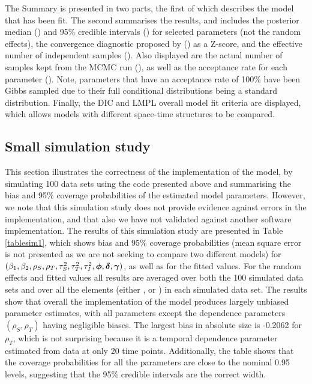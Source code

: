 \documentclass[article, nojss]{jss}
\newcommand{\bd}[1]{\ensuremath{\mbox{\boldmath $#1$}}}
\begin{document}
The Summary is presented in two parts, the first of which describes the model that has been fit. The second summarises the results, and includes the posterior median () and 95\% credible intervals () for selected parameters (not the random effects), the convergence diagnostic proposed by \cite{geweke1992} () as a Z-score, and the effective number of independent samples (). Also displayed are the actual number of samples kept from the MCMC run  (), as well as the acceptance rate for each parameter (). Note, parameters that have an acceptance rate of 100\% have been Gibbs sampled due to their full conditional distributions being a standard distribution. Finally, the DIC and LMPL overall model fit criteria are displayed, which allows models with different space-time structures to be compared. 


\subsection{Small simulation study}
This section illustrates the correctness of the  implementation of the  model, by simulating 100 data sets using the code presented above and summarising the bias and 95\% coverage probabilities of the estimated model parameters. However, we note that this simulation study does not provide evidence against errors in the implementation, and that also we have not validated  against another software implementation. The results of this simulation study are presented in Table \ref{tablesim1}, which shows bias and 95\% coverage probabilities (mean square error is not presented as we are not seeking to compare two different models) for $(\beta_1, \beta_2, \rho_S, \rho_T, \tau^2_S, \tau^2_T, \tau^2_I,  \bd{\phi}, \bd{\delta}, \bd{\gamma})$, as well as for the fitted values. For the random effects and fitted values all results are averaged over both the 100 simulated data sets and over all the elements (either ,  or ) in each simulated data set. The results show that overall the  implementation of the  model produces largely unbiased parameter estimates, with all parameters except the dependence parameters $(\rho_S, \rho_T)$ having negligible biases. The largest bias in absolute size is -0.2062 for $\rho_{T}$, which is not surprising because it is a temporal dependence parameter estimated from data at only 20 time points. Additionally, the table shows that the coverage probabilities for all the parameters are close to the nominal 0.95 levels, suggesting that the 95\% credible intervals are the correct width. 
\end{document}
